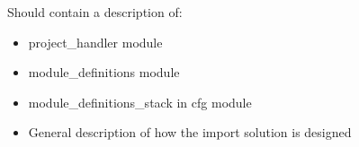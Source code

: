 Should contain a description of:
\begin{itemize}
\item project_handler module
\item module_definitions module
\item module_definitions_stack in cfg module
\item General description of how the import solution is designed
\end{itemize}
